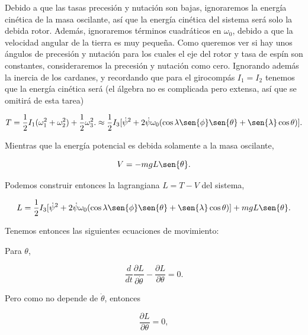\documentclass[a4paper,10pt]{article}
\numberwithin{equation}{section}
\begin{document}
Debido a que las tasas precesión y nutación son bajas, ignoraremos la energía 
cinética de la masa oscilante, así que la energía cinética del sistema será solo 
la debida rotor. Además, ignoraremos términos cuadráticos en $\omega_0$, debido a que 
la velocidad angular de la tierra es muy pequeña. Como queremos ver si hay unos 
ángulos de precesión y nutación para los cuales el eje del rotor y tasa de espín 
son constantes, consideraremos la precesión y nutación como cero. Ignorando además 
la inercia de los cardanes, y recordando que para el girocompás $I_1=I_2$ tenemos 
que la energía cinética será (el álgebra no es complicada pero extensa, así que 
se omitirá de esta tarea)

\begin{equation}
 T = \frac{1}{2}I_1 (\omega_1^2 + \omega_2^2) + \frac{1}{2}\omega_3^2. \approx 
 \frac{1}{2}I_3[\dot{\psi}^2 + 2\dot{\psi}\omega_0(\cos{\lambda}\sen{\phi}\sen{\theta} + 
 \sen{\lambda}\cos{\theta})].
\end{equation}

Mientras que la energía potencial es debida solamente a la masa oscilante,

\begin{equation}
 V = - mgL\sen{\theta}.
\end{equation}

Podemos construir entonces la lagrangiana $L = T - V$ del sistema,

\begin{equation}
 L = \frac{1}{2}I_3[\dot{\psi}^2 + 2\dot{\psi}\omega_0(\cos{\lambda}\sen{\phi}\sen{\theta} + 
 \sen{\lambda}\cos{\theta})] + mgL\sen{\theta}.
 \label{eq:lagrangianaGirocompas}
\end{equation}

Tenemos entonces las siguientes ecuaciones de movimiento:

\vspace{.3cm}

Para $\theta$, 

\begin{equation}
 \frac{d}{dt}\frac{\partial L}{\partial \dot{\theta}} - \frac{\partial L}{\partial \theta} = 0.
\end{equation}

Pero como  no depende de $\dot{\theta}$, entonces 

\begin{equation}
 \frac{\partial L}{\partial \theta} = 0,
\end{equation}
\end{document}
